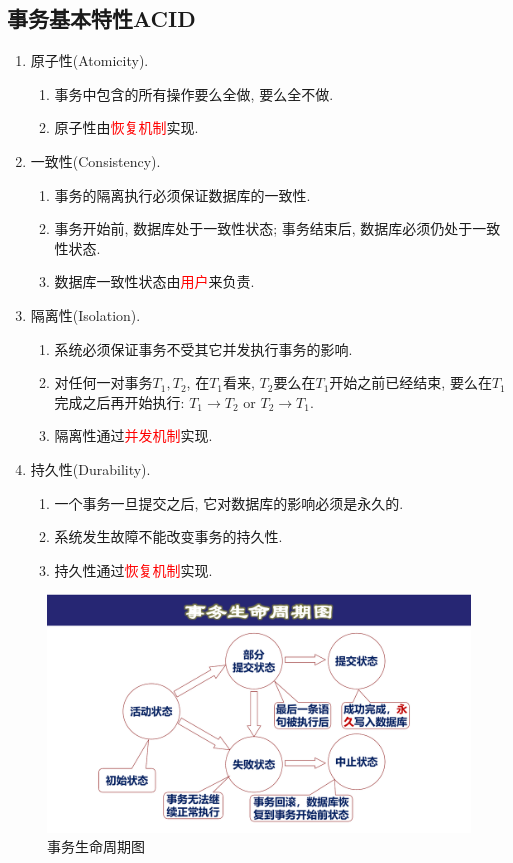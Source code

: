 \subsection{事务基本特性ACID}

\begin{enumerate}
    \item 原子性(Atomicity).
    \begin{enumerate}
        \item 事务中包含的所有操作要么全做, 要么全不做.
        \item 原子性由\textcolor{red}{恢复机制}实现.
    \end{enumerate}
    \item 一致性(Consistency).
    \begin{enumerate}
        \item 事务的隔离执行必须保证数据库的一致性.
        \item 事务开始前, 数据库处于一致性状态; 事务结束后, 数据库必须仍处于一致性状态.
        \item 数据库一致性状态由\textcolor{red}{用户}来负责.
    \end{enumerate}
    \item 隔离性(Isolation).
    \begin{enumerate}
        \item 系统必须保证事务不受其它并发执行事务的影响.
        \item 对任何一对事务$T_1,T_2$, 在$T_1$看来, $T_2$要么在$T_1$开始之前已经结束, 要么在$T_1$完成之后再开始执行: $T_1\to T_2 \text{ or } T_2\to T_1$.
        \item 隔离性通过\textcolor{red}{并发机制}实现.
    \end{enumerate}
    \item 持久性(Durability).
    \begin{enumerate}
        \item 一个事务一旦提交之后, 它对数据库的影响必须是永久的.
        \item 系统发生故障不能改变事务的持久性.
        \item 持久性通过\textcolor{red}{恢复机制}实现.
    \end{enumerate}
\end{enumerate}

\begin{figure}[H]
    \centering
    \includegraphics[width=.6\textwidth]{./figure/事务生命周期.pdf}
    \caption{事务生命周期图}
\end{figure}

